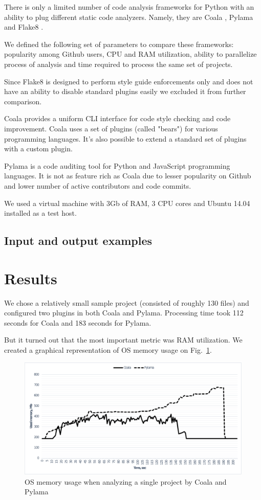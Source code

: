 \documentclass[runningheads,a4paper]{llncs}
\begin{document}
There is only a limited number of code analysis frameworks for Python with an ability
to plug different static code analyzers. Namely, they are Coala \cite{item13},
Pylama \cite{item14} and Flake8 \cite{item15}.

We defined the following set of parameters to compare these frameworks:
popularity among Github \cite{item16} users, CPU and RAM utilization, ability to
parallelize process of analysis and time required to process the same set of projects.

Since Flake8 is designed to perform style guide enforcements only and does not
have an ability to disable standard plugins easily we excluded it from further comparison.

Coala provides a uniform CLI interface for code style checking and code
improvement. Coala uses a set of plugins (called "bears") for various
programming languages. It's also possible to extend a standard set of
plugins with a custom plugin.

Pylama is a code auditing tool for Python and JavaScript programming
languages. It is not as feature rich as Coala due to lesser popularity
on Github and lower number of active contributors and code commits.

We used a virtual machine with 3Gb of RAM, 3 CPU cores and Ubuntu 14.04
installed as a test host.

\subsection{Input and output examples}

\section{Results}

We chose a relatively small sample project (consisted
of roughly 130 files) and configured two plugins in both Coala and Pylama.
Processing time took 112 seconds for Coala and 183 seconds for Pylama.

But it turned out that the most important metric was RAM utilization. We created
a graphical representation of OS memory usage on Fig.~\ref{fig:memusage}.

%
\begin{figure}
	\centering
	\includegraphics[width=\linewidth]{memusage}
	\caption{OS memory usage when analyzing a single project by Coala and Pylama}
	\label{fig:memusage}
\end{figure}
%
\end{document}
